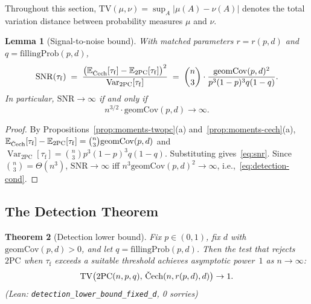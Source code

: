 \documentclass[reqno,12pt]{amsart}
\newcommand{\tauf}{\tau_{\mathrm{f}}}
\newcommand{\PC}{\mathrm{2PC}}
\newcommand{\Cech}{\ifmmode\text{\v{C}ech}\else\v{C}ech\fi}  %
\newcommand{\TV}{\mathrm{TV}}
\newcommand{\geomCov}{\mathrm{geomCov}}
\newcommand{\fillingP}{\mathrm{fillingProb}}
\newcommand{\EE}{\mathbb{E}}
\DeclareMathOperator{\Var}{Var}
\newcommand{\leanverified}[1]{\textup{(Lean: \texttt{#1}, 0 sorries)}}
\theoremstyle{plain}
\newtheorem{theorem}{Theorem}[section]
\newtheorem{lemma}[theorem]{Lemma}
\theoremstyle{definition}
\theoremstyle{remark}
\begin{document}
Throughout this section, $\TV(\mu,\nu) = \sup_{A}|\mu(A) - \nu(A)|$ denotes the total
variation distance between probability measures $\mu$ and $\nu$.

\begin{lemma}[Signal-to-noise bound]\label{lem:snr}
With matched parameters $r = r(p,d)$ and $q = \fillingP(p,d)$,
\begin{equation}\label{eq:snr}
  \mathrm{SNR}(\tauf)
  \;=\; \frac{\bigl(\EE_{\Cech}[\tauf]-\EE_{\PC}[\tauf]\bigr)^2}{\Var_{\PC}[\tauf]}
  \;=\; \binom{n}{3}\cdot\frac{\geomCov(p,d)^2}{p^3(1-p)^3 q(1-q)}.
\end{equation}
In particular, $\mathrm{SNR}\to\infty$ if and only if
\begin{equation}\label{eq:detection-cond}
  n^{3/2}\cdot\geomCov(p,d)\to\infty.
\end{equation}
\end{lemma}

\begin{proof}
By Propositions~\ref{prop:moments-twopc}(a) and~\ref{prop:moments-cech}(a),
$\EE_{\Cech}[\tauf]-\EE_{\PC}[\tauf] = \binom{n}{3}\geomCov(p,d)$ and
$\Var_{\PC}[\tauf] = \binom{n}{3}p^3(1-p)^3 q(1-q)$. Substituting gives~\eqref{eq:snr}.
Since $\binom{n}{3}=\Theta(n^3)$, $\mathrm{SNR}\to\infty$ iff $n^3\geomCov(p,d)^2\to\infty$,
i.e.,~\eqref{eq:detection-cond}.
\end{proof}

\subsection{The Detection Theorem}

\begin{theorem}[Detection lower bound]\label{thm:detection}
Fix $p\in(0,1)$, fix $d$ with $\geomCov(p,d) > 0$, and let $q = \fillingP(p,d)$. Then
the test that rejects~$\PC$ when $\tauf$ exceeds a suitable threshold achieves asymptotic
power~$1$ as $n\to\infty$:
\[
  \TV\bigl(\PC(n,p,q),\,\Cech(n,r(p,d),d)\bigr)\to 1.
\]
\hfill \leanverified{detection\_lower\_bound\_fixed\_d}
\end{theorem}
\end{document}
